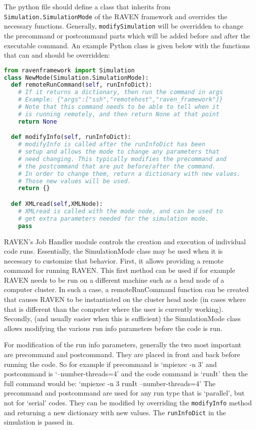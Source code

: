 The python file should define a class that inherits from
\texttt{Simulation.SimulationMode} of the RAVEN framework and overrides the
necessary functions. Generally, \texttt{modifySimulation} will be overridden to
change the precommand or postcommand parts which will be added before and after
the executable command.
%
An example Python class is given below with the functions that can and should be
overridden:

\begin{lstlisting}[language=python]
from ravenframework import Simulation
class NewMode(Simulation.SimulationMode):
  def remoteRunCommand(self, runInfoDict):
    # If it returns a dictionary, then run the command in args
    # Example: {"args":["ssh","remotehost","raven_framework"]}
    # Note that this command needs to be able to tell when it
    # is running remotely, and then return None at that point
    return None

  def modifyInfo(self, runInfoDict):
    # modifyInfo is called after the runInfoDict has been
    # setup and allows the mode to change any parameters that
    # need changing. This typically modifies the precommand and
    # the postcommand that are put before/after the command.
    # In order to change them, return a dictionary with new values.
    # Those new values will be used.
    return {}

  def XMLread(self,XMLNode):
    # XMLread is called with the mode node, and can be used to
    # get extra parameters needed for the simulation mode.
    pass
\end{lstlisting}

RAVEN's Job Handler module controls the creation and execution of
individual code runs. Essentially, the SimulationMode class may be
used when it is necessary to customize that behavior. First, it allows
providing a remote command for running RAVEN. This first method can be
used if for example RAVEN needs to be run on a different machine such
as a head node of a computer cluster. In such a case, a
remoteRunCommand function can be created that causes RAVEN to be
instantiated on the cluster head node (in cases where that is
different than the computer where the user is currently working).
Secondly, (and usually easier when this is sufficient) the
SimulationMode class allows modifying the various run info parameters
before the code is run.

For modification of the run info parameters, generally the two most
important are precommand and postcommand. They are placed in front and
back before running the code.  So for example if precommand is
`mpiexec -n 3' and postcommand is `--number-threads=4' and the code
command is `runIt' then the full command would be: `mpiexec -n 3 runIt
--number-threads=4' The precommand and postcommand are used for any
run type that is `parallel', but not for `serial' codes.  They can be
modified by overriding the \verb'modifyInfo' method and returning a
new dictionary with new values.  The \verb'runInfoDict' in the
simulation is passed in.

